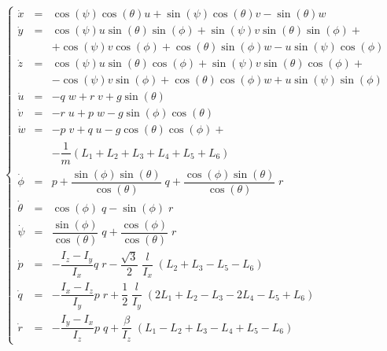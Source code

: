 \begin{equation}
\left\{\begin{array}{rcl}
\dot{x} &=&\cos ( \psi) \cos ( \theta) u +\sin ( \psi) \cos ( \theta) v -\sin ( \theta) w \\
\dot{y} &=& \cos ( \psi ) u \sin ( \theta ) \sin ( \phi) +\sin( \psi) v \sin ( \theta) \sin ( \phi ) + \\ & &  +\cos ( \psi) v  \cos ( \phi) +\cos ( \theta) \sin ( \phi ) w -u \sin ( \psi) \cos ( \phi) \\
\dot{z} & = &\cos ( \psi) u \sin ( \theta ) \cos ( \phi) +\sin( \psi) v \sin ( \theta) \cos ( \phi ) + \\ & & -\cos ( \psi) v  \sin ( \phi) +\cos (\theta) \cos ( \phi ) w +u \sin ( \psi) \sin ( \phi) \\
\dot{u} & = & - q\;w + r\;v + g \sin(\theta) \\
\dot{v} & = & - r\;u + p\;w - g \sin(\phi) \cos(\theta) \\
\dot{w} & = & - p\;v + q\;u - g \cos(\theta) \cos(\phi) + \\ & &-\dfrac{1}{m} \left(L_1 + L_2 + L_3 + L_4 + L_5 + L_6 \right) \\

\dot{\phi} & = & p + \dfrac{\sin(\phi) \sin(\theta)}{\cos(\theta)}\;q + \dfrac{\cos(\phi) \sin(\theta)}{\cos(\theta)}\;r \\
\dot{\theta} & = & \cos(\phi)\;q - \sin(\phi)\;r \\
\dot{\psi} & = & \dfrac{\sin(\phi)}{\cos(\theta)}\;q + \dfrac{\cos(\phi)}{\cos(\theta)}\;r \\
\dot{p} & = & -\dfrac{I_z-I_y}{I_x} q\;r -\dfrac{\sqrt{3}}{2}\;\dfrac{l}{I_x}\;\left( L_2 +L_3 - L_5 - L_6 \right) \\
\dot{q} & = & -\dfrac{I_x-I_z}{I_y} p\;r + \dfrac{1}{2}\;\dfrac{l}{I_y}\;\left( 2 L_1 + L_2 -L_3 - 2 L_4 - L_5 + L_6 \right) \\
\dot{r} & = & -\dfrac{I_y-I_x}{I_z} p\;q + \dfrac{\beta}{I_z}\;\left( L_1 - L_2 + L_3 - L_4 + L_5 - L_6 \right)
\end{array}\right.
\end{equation}

